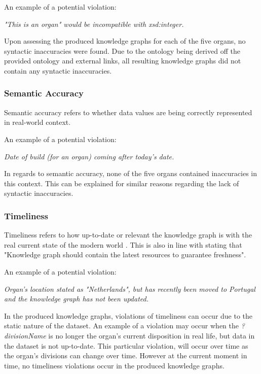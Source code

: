 \noindent An example of a potential violation: 
\begin{displayquote}
    \textit{"This is an organ" would be incompatible with xsd:integer.}
\end{displayquote}

Upon assessing the produced knowledge graphs for each of the five organs, no syntactic inaccuracies were found. Due to the ontology being derived off the provided ontology and external links, all resulting knowledge graphs did not contain any syntactic inaccuracies. 

\subsubsection{Semantic Accuracy}
\hspace{0.5cm} Semantic accuracy refers to whether data values are being correctly represented in real-world context. \cite{knowledgegraphevaulationbook}

\noindent An example of a potential violation: 
\begin{displayquote}
    \textit{Date of build (for an organ) coming after today's date.}
\end{displayquote}

In regards to semantic accuracy, none of the five organs contained inaccuracies in this context. This can be explained for similar reasons regarding the lack of syntactic inaccuracies. 

\subsubsection{Timeliness}
\hspace{0.5cm} Timeliness refers to how up-to-date or relevant the knowledge graph is with the real current state of the modern world \cite{knowledgegraphevaulationbook}. This is also in line with \cite{evaluationpaper} stating that "Knowledge graph should contain the latest resources to guarantee freshness".

\noindent An example of a potential violation:
\begin{displayquote}
    \textit{Organ's location stated as "Netherlands", but has recently been moved to Portugal and the knowledge graph has not been updated.}
\end{displayquote}

In the produced knowledge graphs, violations of timeliness can occur due to the static nature of the dataset. An example of a violation may occur when the \textit{?divisionName} is no longer the organ's current disposition in real life, but data in the dataset is not up-to-date. This particular violation, will occur over time as the organ's divisions can change over time. However at the current moment in time, no timeliness violations occur in the produced knowledge graphs.

